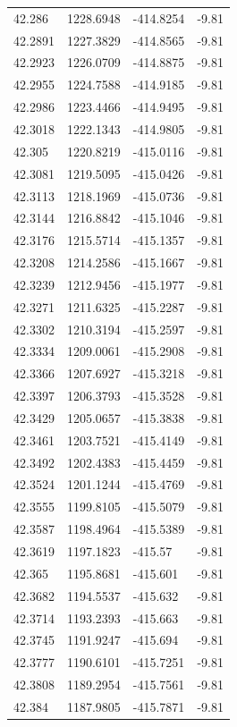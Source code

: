 \begin{table}[H]
\begin{tabular}{llll}
42.286 & 1228.6948 & -414.8254 & -9.81 \\
42.2891 & 1227.3829 & -414.8565 & -9.81 \\
42.2923 & 1226.0709 & -414.8875 & -9.81 \\
42.2955 & 1224.7588 & -414.9185 & -9.81 \\
42.2986 & 1223.4466 & -414.9495 & -9.81 \\
42.3018 & 1222.1343 & -414.9805 & -9.81 \\
42.305 & 1220.8219 & -415.0116 & -9.81 \\
42.3081 & 1219.5095 & -415.0426 & -9.81 \\
42.3113 & 1218.1969 & -415.0736 & -9.81 \\
42.3144 & 1216.8842 & -415.1046 & -9.81 \\
42.3176 & 1215.5714 & -415.1357 & -9.81 \\
42.3208 & 1214.2586 & -415.1667 & -9.81 \\
42.3239 & 1212.9456 & -415.1977 & -9.81 \\
42.3271 & 1211.6325 & -415.2287 & -9.81 \\
42.3302 & 1210.3194 & -415.2597 & -9.81 \\
42.3334 & 1209.0061 & -415.2908 & -9.81 \\
42.3366 & 1207.6927 & -415.3218 & -9.81 \\
42.3397 & 1206.3793 & -415.3528 & -9.81 \\
42.3429 & 1205.0657 & -415.3838 & -9.81 \\
42.3461 & 1203.7521 & -415.4149 & -9.81 \\
42.3492 & 1202.4383 & -415.4459 & -9.81 \\
42.3524 & 1201.1244 & -415.4769 & -9.81 \\
42.3555 & 1199.8105 & -415.5079 & -9.81 \\
42.3587 & 1198.4964 & -415.5389 & -9.81 \\
42.3619 & 1197.1823 & -415.57 & -9.81 \\
42.365 & 1195.8681 & -415.601 & -9.81 \\
42.3682 & 1194.5537 & -415.632 & -9.81 \\
42.3714 & 1193.2393 & -415.663 & -9.81 \\
42.3745 & 1191.9247 & -415.694 & -9.81 \\
42.3777 & 1190.6101 & -415.7251 & -9.81 \\
42.3808 & 1189.2954 & -415.7561 & -9.81 \\
42.384 & 1187.9805 & -415.7871 & -9.81 \\

\end{tabular}
\end{table}
